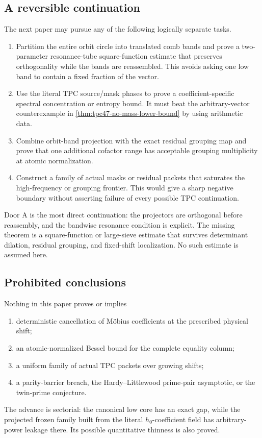 \subsection{A reversible continuation}

The next paper may pursue any of the following logically separate
tasks.
\begin{enumerate}[label=\textbf{Door \Alph*.},leftmargin=3.7em]
 \item Partition the entire orbit circle into translated comb bands and
       prove a two-parameter resonance-tube square-function estimate
       that preserves orthogonality while the bands are reassembled.
       This avoids asking one low band to contain a fixed fraction of
       the vector.
 \item Use the literal TPC source/mask phases to prove a
       coefficient-specific spectral concentration or entropy bound.
       It must beat the arbitrary-vector counterexample in
       \cref{thm:tpc47-no-mass-lower-bound} by using arithmetic data.
 \item Combine orbit-band projection with the exact residual grouping
       map and prove that one additional cofactor range has acceptable
       grouping multiplicity at atomic normalization.
 \item Construct a family of actual masks or residual packets that
       saturates the high-frequency or grouping frontier.  This would
       give a sharp negative boundary without asserting failure of
       every possible TPC continuation.
\end{enumerate}

Door A is the most direct continuation: the projectors are orthogonal
before reassembly, and the bandwise resonance condition is explicit.
The missing theorem is a square-function or large-sieve estimate that
survives determinant dilation, residual grouping, and fixed-shift
localization.  No such estimate is assumed here.

\subsection{Prohibited conclusions}

Nothing in this paper proves or implies
\begin{enumerate}[label=\textup{(\roman*)},leftmargin=2.4em]
 \item deterministic cancellation of M\"obius coefficients at the
       prescribed physical shift;
 \item an atomic-normalized Bessel bound for the complete equality
       column;
 \item a uniform family of actual TPC packets over growing shifts;
 \item a parity-barrier breach, the Hardy--Littlewood prime-pair
       asymptotic, or the twin-prime conjecture.
\end{enumerate}
The advance is sectorial: the canonical low core has an exact gap, while
the projected frozen family built from the literal \(h_0\)-coefficient
field has arbitrary-power leakage there.  Its possible quantitative
thinness is also proved.
